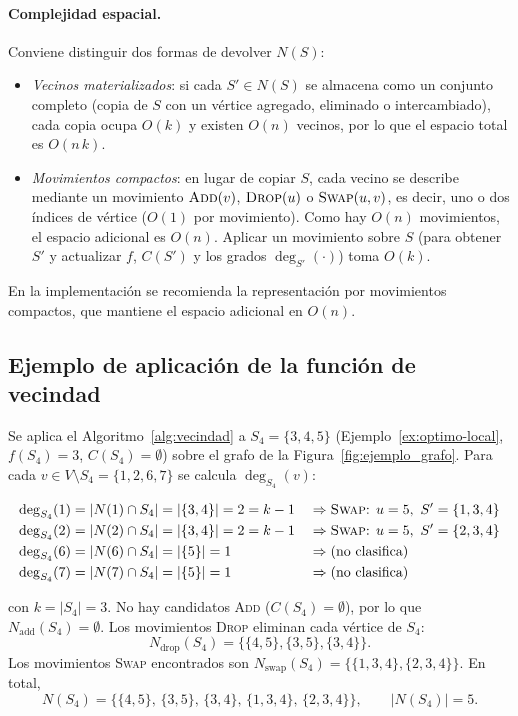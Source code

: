 \documentclass[letterpaper,12pt]{article}
\newcounter{ejemplo}
\begin{document}
\paragraph{Complejidad espacial.} Conviene distinguir dos formas de devolver $N(S)$:
\begin{itemize}
    \item \emph{Vecinos materializados}: si cada $S' \in N(S)$ se almacena como un conjunto completo (copia de $S$ con un vértice agregado, eliminado o intercambiado), cada copia ocupa $O(k)$ y existen $O(n)$ vecinos, por lo que el espacio total es $O(n\,k)$.
    \item \emph{Movimientos compactos}: en lugar de copiar $S$, cada vecino se describe mediante un movimiento $\textsc{Add}(v)$, $\textsc{Drop}(u)$ o $\textsc{Swap}(u,v)$, es decir, uno o dos índices de vértice ($O(1)$ por movimiento). Como hay $O(n)$ movimientos, el espacio adicional es $O(n)$. Aplicar un movimiento sobre $S$ (para obtener $S'$ y actualizar $f$, $C(S')$ y los grados $\deg_{S'}(\cdot)$) toma $O(k)$.
\end{itemize}
En la implementación se recomienda la representación por movimientos compactos, que mantiene el espacio adicional en $O(n)$.

\subsection{Ejemplo de aplicación de la función de vecindad}

Se aplica el Algoritmo~\ref{alg:vecindad} a $S_4=\{3,4,5\}$ (Ejemplo~\ref{ex:optimo-local}, $f(S_4)=3$, $C(S_4)=\emptyset$) sobre el grafo de la Figura~\ref{fig:ejemplo_grafo}. Para cada $v \in V\setminus S_4 = \{1,2,6,7\}$ se calcula $\deg_{S_4}(v)$:

\[
\begin{aligned}
\deg_{S_4}(1) &= |N(1)\cap S_4| = |\{3,4\}| = 2 = k-1 &&\Rightarrow \text{\textsc{Swap}: } u=5,\ S'=\{1,3,4\}\\
\deg_{S_4}(2) &= |N(2)\cap S_4| = |\{3,4\}| = 2 = k-1 &&\Rightarrow \text{\textsc{Swap}: } u=5,\ S'=\{2,3,4\}\\
\deg_{S_4}(6) &= |N(6)\cap S_4| = |\{5\}| = 1 &&\Rightarrow \text{(no clasifica)}\\
\deg_{S_4}(7) &= |N(7)\cap S_4| = |\{5\}| = 1 &&\Rightarrow \text{(no clasifica)}
\end{aligned}
\]

con $k=|S_4|=3$. No hay candidatos \textsc{Add} ($C(S_4)=\emptyset$), por lo que $N_{\text{add}}(S_4)=\emptyset$. Los movimientos \textsc{Drop} eliminan cada vértice de $S_4$:
\[
N_{\text{drop}}(S_4) = \{\{4,5\}, \{3,5\}, \{3,4\}\}.
\]
Los movimientos \textsc{Swap} encontrados son $N_{\text{swap}}(S_4) = \{\{1,3,4\}, \{2,3,4\}\}$. En total,
\[
N(S_4) = \{\{4,5\},\, \{3,5\},\, \{3,4\},\, \{1,3,4\},\, \{2,3,4\}\}, \qquad |N(S_4)|=5.
\]
\end{document}
